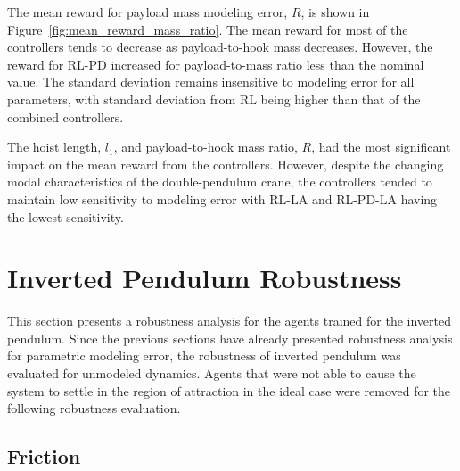 The mean reward for payload mass modeling error, $R$, is shown in Figure~\ref{fig:mean_reward_mass_ratio}. The mean reward for most of the controllers tends to decrease as payload-to-hook mass decreases. However, the reward for RL-PD increased for payload-to-mass ratio less than the nominal value.
The standard deviation remains insensitive to modeling error for all parameters, with standard deviation from RL being higher than that of the combined controllers.

The hoist length, $l_1$, and payload-to-hook mass ratio, $R$, had the most significant impact on the mean reward from the controllers. However, despite the changing modal characteristics of the double-pendulum crane, the controllers tended to maintain low sensitivity to modeling error with RL-LA and RL-PD-LA having the lowest sensitivity.

\section{Inverted Pendulum Robustness}

This section presents a robustness analysis for the agents trained for the inverted pendulum. Since the previous sections have already presented robustness analysis for parametric modeling error, the robustness of inverted pendulum was evaluated for unmodeled dynamics.
Agents that were not able to cause the system to settle in the region of attraction in the ideal case were removed for the following robustness evaluation.

\subsection{Friction}

